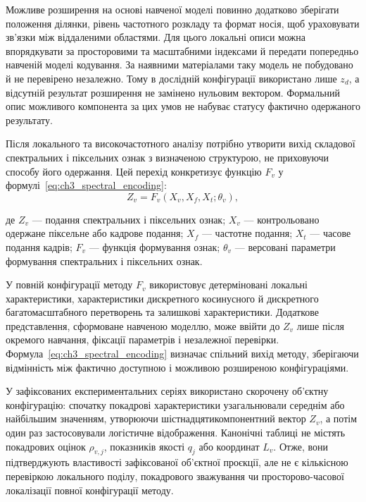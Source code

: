 Можливе розширення на основі навченої моделі повинно додатково зберігати положення ділянки, рівень частотного розкладу та формат носія, щоб ураховувати зв’язки між віддаленими областями. Для цього локальні описи можна впорядкувати за просторовими та масштабними індексами й передати попередньо навченій моделі кодування. За наявними матеріалами таку модель не побудовано й не перевірено незалежно. Тому в дослідній конфігурації використано лише $z_d$, а відсутній результат розширення не замінено нульовим вектором. Формальний опис можливого компонента за цих умов не набуває статусу фактично одержаного результату.

Після локального та високочастотного аналізу потрібно утворити вихід складової спектральних і піксельних ознак з визначеною структурою, не приховуючи способу його одержання. Цей перехід конкретизує функцію $F_v$ у формулі~\eqref{eq:ch3_spectral_encoding}:
\begin{equation}
Z_v=F_v(X_v,X_f,X_t;\theta_v),
\label{eq:ch3_spectral_encoding}
\end{equation}

де $Z_v$ --- подання спектральних і піксельних ознак; $X_v$ --- контрольовано одержане піксельне або кадрове подання; $X_f$ --- частотне подання; $X_t$ --- часове подання кадрів; $F_v$ --- функція формування ознак; $\theta_v$ --- версовані параметри формування спектральних і піксельних ознак.

У повній конфігурації методу $F_v$ використовує детерміновані локальні характеристики, характеристики дискретного косинусного й дискретного багатомасштабного перетворень та залишкові характеристики. Додаткове представлення, сформоване навченою моделлю, може ввійти до $Z_v$ лише після окремого навчання, фіксації параметрів і незалежної перевірки. Формула~\eqref{eq:ch3_spectral_encoding} визначає спільний вихід методу, зберігаючи відмінність між фактично доступною і можливою розширеною конфігураціями.

У зафіксованих експериментальних серіях використано скорочену об’єктну конфігурацію: спочатку покадрові характеристики узагальнювали середнім або найбільшим значенням, утворюючи шістнадцятикомпонентний вектор $Z_v$, а потім один раз застосовували логістичне відображення. Канонічні таблиці не містять покадрових оцінок $\rho_{v,j}$, показників якості $q_j$ або координат $L_v$. Отже, вони підтверджують властивості зафіксованої об’єктної проєкції, але не є кількісною перевіркою локального поділу, покадрового зважування чи просторово-часової локалізації повної конфігурації методу.

